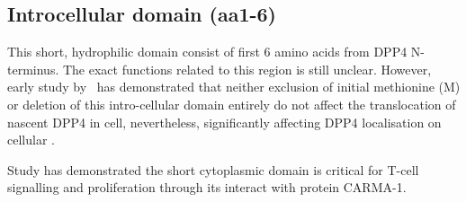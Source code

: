 \subsection{Introcellular domain (aa1-6)}

This short, hydrophilic domain consist of first 6 amino acids from DPP4 N-terminus. The exact functions related to this region is still unclear. However, early study by~\citet{Hong1990} has demonstrated that neither exclusion of initial methionine (M) or deletion of this intro-cellular domain entirely do not affect the translocation of nascent DPP4 in cell, nevertheless, significantly affecting DPP4 localisation on cellular . 

Study has demonstrated the short cytoplasmic domain is critical for T-cell signalling and proliferation through its interact with protein CARMA-1. \cite{Ohnuma_2007}